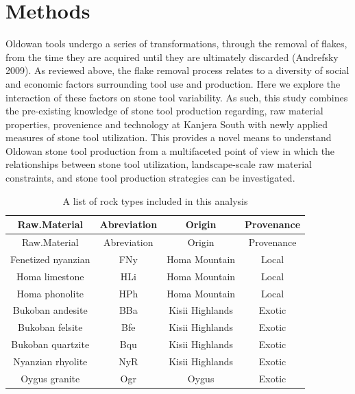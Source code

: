 \documentclass[]{elsarticle} %
\begin{document}
\hypertarget{methods}{%
\section{Methods}\label{methods}}

Oldowan tools undergo a series of transformations, through the removal
of flakes, from the time they are acquired until they are ultimately
discarded (Andrefsky 2009). As reviewed above, the flake removal process
relates to a diversity of social and economic factors surrounding tool
use and production. Here we explore the interaction of these factors on
stone tool variability. As such, this study combines the pre-existing
knowledge of stone tool production regarding, raw material properties,
provenience and technology at Kanjera South with newly applied measures
of stone tool utilization. This provides a novel means to understand
Oldowan stone tool production from a multifaceted point of view in which
the relationships between stone tool utilization, landscape-scale raw
material constraints, and stone tool production strategies can be
investigated.

\begin{longtable}[]{@{}cccc@{}}
\caption{A list of rock types included in this analysis}\tabularnewline
\toprule
Raw.Material & Abreviation & Origin & Provenance\tabularnewline
\midrule
\endfirsthead
\toprule
Raw.Material & Abreviation & Origin & Provenance\tabularnewline
\midrule
\endhead
Fenetized nyanzian & FNy & Homa Mountain & Local\tabularnewline
Homa limestone & HLi & Homa Mountain & Local\tabularnewline
Homa phonolite & HPh & Homa Mountain & Local\tabularnewline
Bukoban andesite & BBa & Kisii Highlands & Exotic\tabularnewline
Bukoban felsite & Bfe & Kisii Highlands & Exotic\tabularnewline
Bukoban quartzite & Bqu & Kisii Highlands & Exotic\tabularnewline
Nyanzian rhyolite & NyR & Kisii Highlands & Exotic\tabularnewline
Oygus granite & Ogr & Oygus & Exotic\tabularnewline
\bottomrule
\end{longtable}
\end{document}
